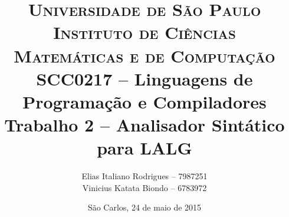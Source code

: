 \begin{titlepage}

		\title{
\textsc {\large{Universidade de São Paulo\\
Instituto de Ciências Matemáticas e de Computação}}\\[1cm]
\large{SCC0217 -- Linguagens de Programação e Compiladores}\\[6cm]
\LARGE{Trabalho 2 -- Analisador Sintático para LALG}\\[5.5cm]
		}

		\author{
Elias Italiano Rodrigues -- 7987251\\
Vinicius Katata Biondo -- 6783972
		}

		\date{
\vfill São Carlos, 24 de maio de 2015
		}

		\maketitle
		\thispagestyle{empty}

\end{titlepage}

